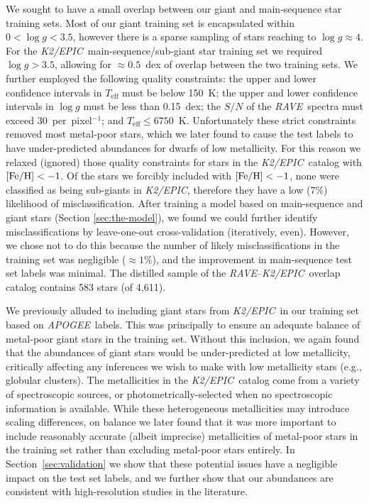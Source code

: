 \documentclass[preprint,trackchanges]{aastex}
\newcommand{\acronym}[1]{{\small{#1}}}
\newcommand{\project}[1]{\textsl{#1}}
\newcommand{\rave}{\project{\acronym{RAVE}}}
\newcommand{\apogee}{\project{\acronym{APOGEE}}}
\newcommand{\epic}{\project{K2/EPIC}}
\newcommand{\teff}{T_{\mathrm{eff}}}
\newcommand{\logg}{\log g}
\begin{document}
We sought to have a small overlap between our giant and main-sequence star training
sets.  Most of our giant training set is encapsulated within $0 < \logg < 3.5$, 
however there is a sparse sampling of stars reaching to $\logg \approx 4$.  For
the \epic\ main-sequence/sub-giant star training set we required $\logg > 3.5$,
allowing for $\approx0.5$~dex of overlap between the two training sets.  We further
employed the following quality constraints: the upper and lower confidence intervals 
in $\teff$ must be below 150~K; the upper and lower confidence intervals in $\logg$ 
must be less than 0.15~dex; the $S/N$ of the \rave\ spectra must exceed 
30~per~pixel$^{-1}$; and $\teff \leqslant 6750$~K.  Unfortunately these strict constraints
removed most metal-poor stars, which we later found to cause the test labels to have
under-predicted abundances for dwarfs of low metallicity.  For this reason we relaxed
(ignored) those quality constraints for stars in the \epic\ catalog with 
$[{\rm Fe/H}] < -1$.  Of the stars we forcibly included with $[{\rm Fe/H}] < -1$,
none were classified as being sub-giants in \epic, therefore they have a low (7\%)
likelihood of misclassification.  After training a model based on main-sequence and
giant stars (Section \ref{sec:the-model}), we found we could further identify 
misclassifications by leave-one-out cross-validation (iteratively, even).  However,
we chose not to do this because the number of likely misclassifications in the training
set was negligible ($\approx1$\%), and the improvement in main-sequence test set labels
was minimal.  The distilled sample of the \rave--\epic\ overlap catalog contains 583 
stars (of 4,611).


We previously alluded to including giant stars from \epic\ in our training set based 
on \apogee\ labels.  This was principally to ensure an adequate balance of metal-poor
giant stars in the training set.  Without this inclusion, we again found that the
abundances of giant stars would be under-predicted at low metallicity, critically 
affecting any inferences we wish to make with low metallicity stars (e.g., globular
clusters).  The metallicities in the \epic\ catalog come from a variety of spectroscopic
sources, or photometrically-selected when no spectroscopic information is available.
While these heterogeneous metallicities may introduce scaling differences, on balance we
later found that it was more important to include reasonably accurate (albeit imprecise)
metallicities of metal-poor stars in the training set rather than excluding metal-poor
stars entirely.  In Section~\ref{sec:validation} we show that these potential issues
have a negligible impact on the test set labels, and we further show that our abundances
are consistent with high-resolution studies in the literature.
\end{document}
